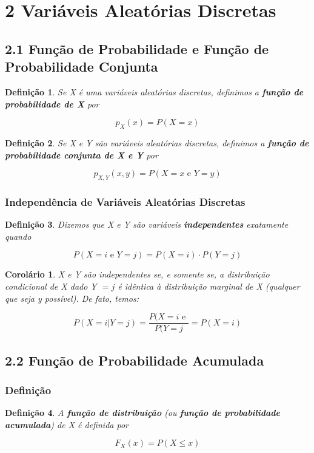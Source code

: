 \documentclass[12pt]{article}
\newtheorem{corollary}{Corolário}[theorem]
\newtheorem{definition}{Definição}
\begin{document}
\section*{2 Variáveis Aleatórias Discretas}
\label{s4}

\subsection*{2.1 Função de Probabilidade e Função de Probabilidade Conjunta}
\label{s5}

\begin{definition}
Se X é uma variáveis aleatórias discretas, definimos a \textbf{função de probabilidade de X} por

$$p_{X} (x) = P(X = x)$$
\end{definition}

\begin{definition}
Se X e Y são variáveis aleatórias discretas, definimos a \textbf{função de probabilidade conjunta de X e Y} por

$$p_{X, Y} (x, y) = P(X = x \text{ e } Y = y)$$
\end{definition}

\subsubsection*{Independência de Variáveis Aleatórias Discretas}
\begin{definition}
Dizemos que X e Y são variáveis \textbf{independentes} exatamente quando

$$P(X = i \text{ e } Y = j) = P(X = i) \cdot P(Y = j)$$
\end{definition}

\begin{corollary}
X e Y são independentes se, e somente se, a distribuição condicional de X dado Y $= j$ é idêntica à distribuição marginal de X (qualquer que seja y possível). De fato, temos:

$$P(X = i | Y = j) = \dfrac{P(X = i \text{ e }}{P(Y = j} = P(X = i)$$
\end{corollary}

\subsection*{2.2 Função de Probabilidade Acumulada}
\label{s6}

\subsubsection*{Definição}
\begin{definition}
A \textbf{função de distribuição} (ou \textbf{função de probabilidade acumulada}) de X é definida por

$$F_X(x) = P(X \leq x)$$
\end{definition}
\end{document}
